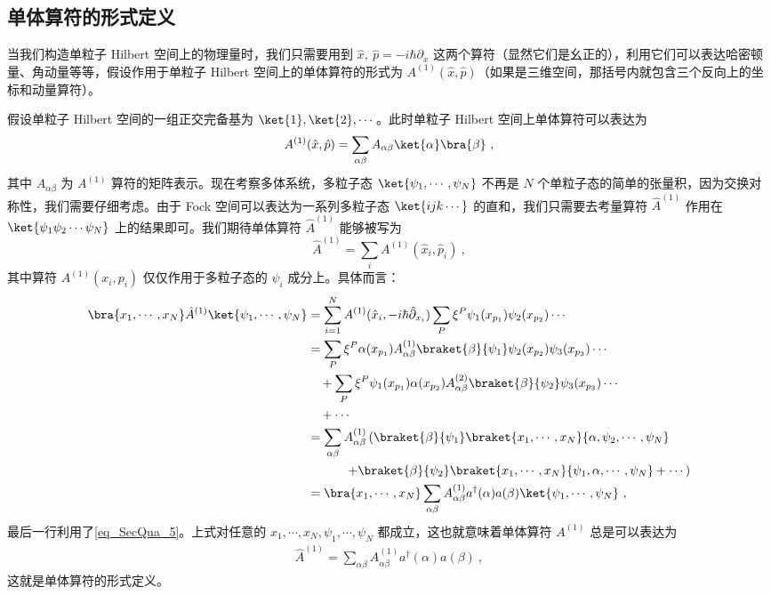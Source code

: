 \subsection{单体算符的形式定义}
当我们构造单粒子 Hilbert 空间上的物理量时，我们只需要用到 $\hat x,\ \hat p=-i\hbar \partial_x$ 这两个算符（显然它们是幺正的），利用它们可以表达哈密顿量、角动量等等，假设作用于单粒子 Hilbert 空间上的单体算符的形式为 $A^{(1)}(\hat x,\hat p)$（如果是三维空间，那括号内就包含三个反向上的坐标和动量算符）。

假设单粒子 Hilbert 空间的一组正交完备基为 $\ket{1},\ket{2},\cdots$。此时单粒子 Hilbert 空间上单体算符可以表达为
\begin{equation}
A^{(1)}(\hat x,\hat p)=\sum_{\alpha\beta}A_{\alpha\beta} \ket{\alpha}\bra{\beta}~,
\end{equation}
其中 $A_{\alpha\beta}$ 为 $A^{(1)}$ 算符的矩阵表示。现在考察多体系统，多粒子态 $\ket{\psi_1,\cdots,\psi_N}$ 不再是 $N$ 个单粒子态的简单的张量积，因为交换对称性，我们需要仔细考虑。由于 Fock 空间可以表达为一系列多粒子态 $\ket{ijk\cdots}$ 的直和，我们只需要去考量算符 $\hat A^{(1)}$ 作用在 $\ket{\psi_1 \psi_2 \cdots\psi_N}$ 上的结果即可。我们期待单体算符 $\hat A^{(1)}$ 能够被写为
\begin{equation}
\hat A^{(1)}=\sum_{i} A^{(1)}(\hat x_i,\hat p_i)~,
\end{equation}
其中算符 $A^{(1)}(x_i,p_i)$ 仅仅作用于多粒子态的 $\psi_i$ 成分上。具体而言：
\begin{equation}
\begin{aligned}
\bra{x_1,\cdots,x_N}\hat A^{(1)} \ket{\psi_1,\cdots,\psi_N}&=\sum_{i=1}^N A^{(1)}(\hat x_i,-i\hbar\hat\partial_{x_i})\sum_{P} \xi^P \psi_1(x_{p_1})\psi_2(x_{p_2})\cdots\\
&=\sum_{P}\xi^P \alpha(x_{p_1})A_{\alpha\beta}^{(1)}\braket{\beta}{\psi_1}\psi_2(x_{p_2})\psi_3(x_{p_3})\cdots\\
&\quad +\sum_P\xi^P \psi_1(x_{p_1})\alpha(x_{p_2})A_{\alpha\beta}^{(2)}\braket{\beta}{\psi_2}\psi_3(x_{p_3})\cdots\\
&\quad +\cdots \\
&=\sum_{\alpha\beta} A_{\alpha\beta}^{(1)}\left(\braket{\beta}{\psi_1} \braket{x_1,\cdots,x_N}{\alpha,\psi_2,\cdots,\psi_N}\right.\\
&\left.\quad \quad\quad+\braket{\beta}{\psi_2}\braket{x_1,\cdots,x_N}{\psi_1,\alpha,\cdots,\psi_N}+\cdots\right)\\
&=\bra{x_1,\cdots,x_N}\sum_{\alpha\beta} A_{\alpha\beta}^{(1)}a^\dagger(\alpha)a(\beta)
\ket{\psi_1,\cdots,\psi_N}~,
\end{aligned}
\end{equation}
最后一行利用了\autoref{eq_SecQua_5}。上式对任意的 $x_1,\cdots,x_N,\psi_1,\cdots,\psi_N$ 都成立，这也就意味着单体算符 $A^{(1)}$ 总是可以表达为
\begin{equation}\label{eq_oneopr_3}
\begin{aligned}
\hat A^{(1)}=\sum_{\alpha\beta}A_{\alpha\beta}^{(1)}a^\dagger(\alpha)a(\beta)~,
\end{aligned}
\end{equation}
这就是单体算符的形式定义。
